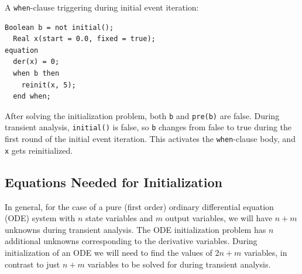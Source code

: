 \begin{example}
A \lstinline!when!-clause triggering during initial event iteration:
\begin{lstlisting}[language=modelica]
  Boolean b = not initial();
  Real x(start = 0.0, fixed = true);
equation
  der(x) = 0;
  when b then
    reinit(x, 5);
  end when;
\end{lstlisting}
After solving the initialization problem, both \lstinline!b! and \lstinline!pre(b)! are false.
During transient analysis, \lstinline!initial()! is false, so \lstinline!b! changes from false to true during the first round of the initial event iteration.
This activates the \lstinline!when!-clause body, and \lstinline!x! gets reinitialized.
\end{example}


\subsection{Equations Needed for Initialization}\label{the-number-of-equations-needed-for-initialization}\label{equations-needed-for-initialization}

\begin{nonnormative}
In general, for the case of a pure (first order) ordinary differential equation (ODE) system with $n$ state variables and $m$ output variables, we will have $n+m$ unknowns during transient analysis.
The ODE initialization problem has $n$ additional unknowns corresponding to the derivative variables.
During initialization of an ODE we will need to find the values of $2n+m$ variables, in contrast to just $n+m$ variables to be solved for during transient analysis.
\end{nonnormative}

